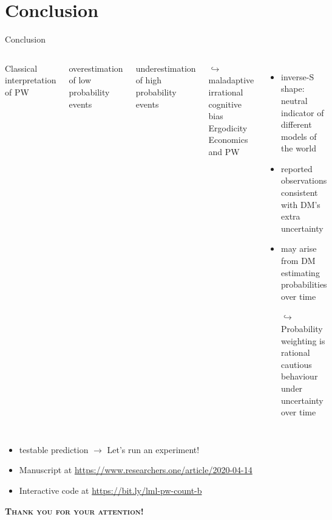 \section{Conclusion}

\begin{frame}{Conclusion}
\begin{columns}[T]
Classical interpretation of PW
\bi
  \item overestimation of low probability events
  \item underestimation of high probability events
	\item[$\hookrightarrow$]	maladaptive irrational cognitive bias
\ei
{}
Ergodicity Economics and PW
\begin{itemize}
  \item inverse-S shape: neutral indicator of different models of the world
	\item reported observations consistent with DM's extra uncertainty
	\item may arise from DM estimating probabilities over time
  \item[$\hookrightarrow$] Probability weighting is rational cautious behaviour under uncertainty over time
\end{itemize}
\end{columns}
\vfill
\begin{itemize}
  \item testable prediction $\to$ Let's run an experiment!
  \item Manuscript at \url{https://www.researchers.one/article/2020-04-14}
  \item Interactive code at \url{https://bit.ly/lml-pw-count-b}    
\end{itemize}

\pause
\centering
\vfill
{\Large \textsc{\textbf{Thank you for your attention!}}}

\end{frame}
